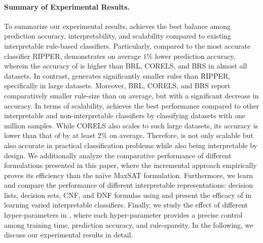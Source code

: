 \paragraph{Summary of Experimental Results.}
To summarize our experimental results, {\imli} achieves the best balance among prediction accuracy, interpretability, and scalability compared to existing interpretable rule-based classifiers. Particularly, compared to the most accurate classifier RIPPER, {\imli} demonstrates on average $ 1\% $ lower prediction accuracy, wherein the accuracy of {\imli} is higher than BRL, CORELS, and BRS in almost all datasets. In contrast, {\imli} generates significantly smaller rules than RIPPER, specifically in large datasets. Moreover, BRL, CORELS, and BRS report comparatively smaller rule-size than {\imli} on average, but with a significant decrease in accuracy.  In terms of scalability, {\imli} achieves the best performance compared to other interpretable and non-interpretable classifiers by classifying datasets with one million samples. While CORELS also scales to such large datasets,  its accuracy is lower than that of {\imli} by at least $ 2\% $ on average.  Therefore, {\imli} is not only scalable but also accurate in practical classification problems while also being interpretable by design.  We additionally analyze the comparative performance of different formulations presented in this paper, where the  incremental approach empirically proves its efficiency than the na\"ive MaxSAT formulation.  Furthermore, we learn and compare the performance of different interpretable representations: decision lists, decision sets, CNF, and DNF formulas using {\imli} and present the efficacy of {\imli} in learning varied interpretable classifiers. Finally, we study the effect of different hyper-parameters in {\imli}, where each hyper-parameter provides a precise control among training time,  prediction accuracy, and rule-sparsity. In the following, we discuss our experimental results in detail. 




